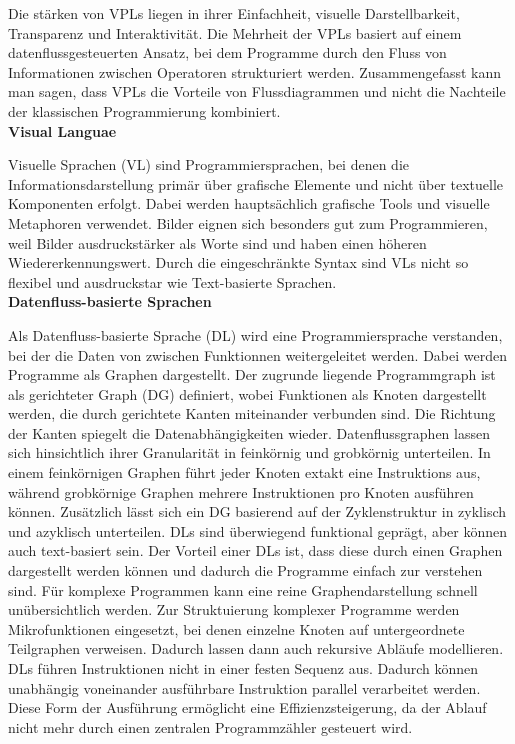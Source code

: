 \documentclass{article}
\begin{document}
    Die stärken von VPLs liegen in ihrer Einfachheit, visuelle Darstellbarkeit, Transparenz und Interaktivität.\cite{13}
    Die Mehrheit der VPLs basiert auf einem datenflussgesteuerten Ansatz, bei dem Programme durch den Fluss von Informationen zwischen Operatoren strukturiert werden. \cite{6}
    Zusammengefasst kann man sagen, dass VPLs die Vorteile von Flussdiagrammen und nicht die Nachteile der klassischen Programmierung kombiniert. \cite{13} \\
    \textbf{Visual Languae} \par
    Visuelle Sprachen (VL) sind Programmiersprachen, bei denen die Informationsdarstellung primär über grafische Elemente und nicht über textuelle Komponenten erfolgt. \cite{5}
    Dabei werden hauptsächlich grafische Tools und visuelle Metaphoren verwendet. Bilder eignen sich besonders gut zum Programmieren, weil Bilder ausdruckstärker als Worte sind und haben einen höheren Wiedererkennungswert. Durch die eingeschränkte Syntax sind VLs nicht so flexibel und ausdruckstar wie Text-basierte Sprachen. \cite{16} \\
    \textbf{Datenfluss-basierte Sprachen} \par
    Als Datenfluss-basierte Sprache (DL) wird eine Programmiersprache verstanden, bei der die Daten von zwischen Funktionnen weitergeleitet werden. Dabei werden Programme als Graphen dargestellt. \cite{11}
    Der zugrunde liegende Programmgraph ist als gerichteter Graph (DG) definiert, wobei Funktionen als Knoten dargestellt werden, die durch gerichtete Kanten miteinander verbunden sind. Die Richtung der Kanten spiegelt die Datenabhängigkeiten wieder.\cite{2}
    Datenflussgraphen lassen sich hinsichtlich ihrer Granularität in feinkörnig und grobkörnig unterteilen. In einem feinkörnigen Graphen führt jeder Knoten extakt eine Instruktions aus, während grobkörnige Graphen mehrere Instruktionen pro Knoten ausführen können.\cite{1}
    Zusätzlich lässt sich ein DG basierend auf der Zyklenstruktur in zyklisch und azyklisch unterteilen. \cite{8}
    DLs sind überwiegend funktional geprägt, aber können auch text-basiert sein. \cite{2}
    Der Vorteil einer DLs ist, dass diese durch einen Graphen dargestellt werden können \cite{11} und dadurch die Programme einfach zur verstehen sind. \cite{6}
    Für komplexe Programmen kann eine reine Graphendarstellung schnell unübersichtlich werden. Zur Struktuierung komplexer Programme werden Mikrofunktionen eingesetzt, bei denen einzelne Knoten auf untergeordnete Teilgraphen verweisen. Dadurch lassen dann auch rekursive Abläufe modellieren. \cite{11}    
    DLs führen Instruktionen nicht in einer festen Sequenz aus. Dadurch können unabhängig voneinander ausführbare Instruktion parallel verarbeitet werden. \cite{1}
    Diese Form der Ausführung ermöglicht eine Effizienzsteigerung, da der Ablauf nicht mehr durch einen zentralen Programmzähler gesteuert wird. \cite{2}
\end{document}
